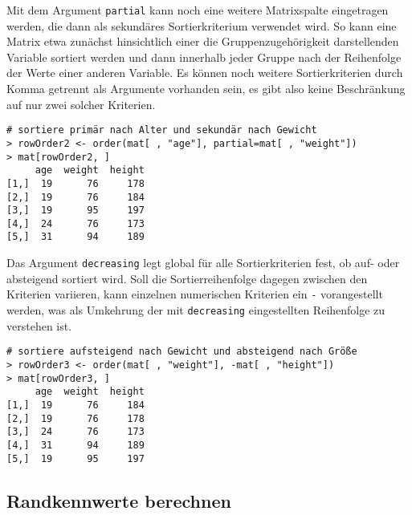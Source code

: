 Mit dem Argument \lstinline!partial! kann noch eine weitere Matrixspalte eingetragen werden, die dann als sekundäres Sortierkriterium verwendet wird. So kann eine Matrix etwa zunächst hinsichtlich einer die Gruppenzugehörigkeit darstellenden Variable sortiert werden und dann innerhalb jeder Gruppe nach der Reihenfolge der Werte einer anderen Variable. Es können noch weitere Sortierkriterien durch Komma getrennt als Argumente vorhanden sein, es gibt also keine Beschränkung auf nur zwei solcher Kriterien.
\begin{lstlisting}
# sortiere primär nach Alter und sekundär nach Gewicht
> rowOrder2 <- order(mat[ , "age"], partial=mat[ , "weight"])
> mat[rowOrder2, ]
     age  weight  height
[1,]  19      76     178
[2,]  19      76     184
[3,]  19      95     197
[4,]  24      76     173
[5,]  31      94     189
\end{lstlisting}

Das Argument \lstinline!decreasing! legt global für alle Sortierkriterien fest, ob auf- oder absteigend sortiert wird. Soll die Sortierreihenfolge dagegen zwischen den Kriterien variieren, kann einzelnen numerischen Kriterien ein \lstinline!-! vorangestellt werden, was als Umkehrung der mit \lstinline!decreasing! eingestellten Reihenfolge zu verstehen ist.
\begin{lstlisting}
# sortiere aufsteigend nach Gewicht und absteigend nach Größe
> rowOrder3 <- order(mat[ , "weight"], -mat[ , "height"])
> mat[rowOrder3, ]
     age  weight  height
[1,]  19      76     184
[2,]  19      76     178
[3,]  24      76     173
[4,]  31      94     189
[5,]  19      95     197
\end{lstlisting}

\subsection{Randkennwerte berechnen}

